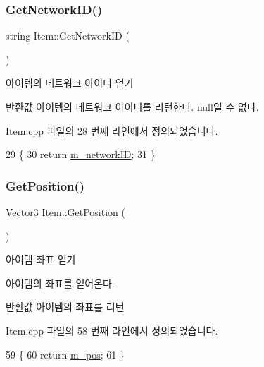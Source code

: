 \subsubsection{\texorpdfstring{Get\+Network\+I\+D()}{GetNetworkID()}}
{\footnotesize\ttfamily string Item\+::\+Get\+Network\+ID (\begin{DoxyParamCaption}{ }\end{DoxyParamCaption})}



아이템의 네트워크 아이디 얻기 

\begin{DoxyReturn}{반환값}
아이템의 네트워크 아이디를 리턴한다. null일 수 없다. 
\end{DoxyReturn}


Item.\+cpp 파일의 28 번째 라인에서 정의되었습니다.


\begin{DoxyCode}
29 \{
30     \textcolor{keywordflow}{return} \hyperlink{class_item_a3e5eae9a0cc3f98e421bc065c5b6f906}{m\_networkID};
31 \}
\end{DoxyCode}
\mbox{\label{class_item_a557cd503b1645e0e610ee66ad25f283c}} 
\subsubsection{\texorpdfstring{Get\+Position()}{GetPosition()}}
{\footnotesize\ttfamily Vector3 Item\+::\+Get\+Position (\begin{DoxyParamCaption}{ }\end{DoxyParamCaption})}



아이템 좌표 얻기 

아이템의 좌표를 얻어온다.

\begin{DoxyReturn}{반환값}
아이템의 좌표를 리턴 
\end{DoxyReturn}


Item.\+cpp 파일의 58 번째 라인에서 정의되었습니다.


\begin{DoxyCode}
59 \{
60     \textcolor{keywordflow}{return} \hyperlink{class_item_a6b35031bbc368a4d04c2298f1b094973}{m\_pos};
61 \}
\end{DoxyCode}
\mbox{\label{class_item_a6c9f4e62259d7ff025f5e4d09597cdba}} 
